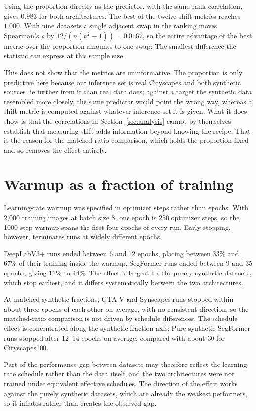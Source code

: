 \documentclass[conference]{IEEEtran}
\begin{document}
Using the proportion directly as the predictor, with the same rank correlation, gives $0.983$ for both architectures. The best of the twelve shift metrics reaches $1.000$. With nine datasets a single adjacent swap in the ranking moves Spearman's $\rho$ by $12/(n(n^2-1)) = 0.0167$, so the entire advantage of the best metric over the proportion amounts to one swap: The smallest difference the statistic can express at this sample size.

This does not show that the metrics are uninformative. The proportion is only predictive here because our inference set is real Cityscapes and both synthetic sources lie further from it than real data does; against a target the synthetic data resembled more closely, the same predictor would point the wrong way, whereas a shift metric is computed against whatever inference set it is given. What it does show is that the correlations in Section~\ref{sec:analysis} cannot by themselves establish that measuring shift adds information beyond knowing the recipe. That is the reason for the matched-ratio comparison, which holds the proportion fixed and so removes the effect entirely.

\section{Warmup as a fraction of training}
\label{sec:warmup}
Learning-rate warmup was specified in optimizer steps rather than epochs. With 2{,}000 training images at batch size $8$, one epoch is 250 optimizer steps, so the 1000-step warmup spans the first four epochs of every run. Early stopping, however, terminates runs at widely different epochs.

DeepLabV3+ runs ended between 6 and 12 epochs, placing between $33\%$ and $67\%$ of their training inside the warmup. SegFormer runs ended between 9 and 35 epochs, giving $11\%$ to $44\%$. The effect is largest for the purely synthetic datasets, which stop earliest, and it differs systematically between the two architectures.

At matched synthetic fractions, GTA-V and Synscapes runs stopped within about three epochs of each other on average, with no consistent direction, so the matched-ratio comparison is not driven by schedule differences. The schedule effect is concentrated along the synthetic-fraction axis: Pure-synthetic SegFormer runs stopped after 12--14 epochs on average, compared with about 30 for Cityscapes100.

Part of the performance gap between datasets may therefore reflect the learning-rate schedule rather than the data itself, and the two architectures were not trained under equivalent effective schedules. The direction of the effect works against the purely synthetic datasets, which are already the weakest performers, so it inflates rather than creates the observed gap.
\end{document}
